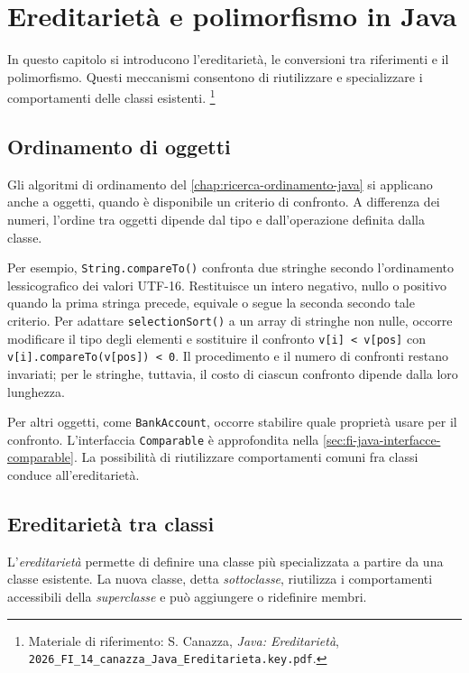 \chapter{Ereditarietà e polimorfismo in Java}
\label{chap:ereditarieta-polimorfismo-java}

In questo capitolo si
introducono l'ereditarietà, le conversioni tra riferimenti e il
polimorfismo. Questi meccanismi consentono di riutilizzare e
specializzare i comportamenti delle classi esistenti.%
\footnote{Materiale di riferimento: S. Canazza,
\emph{Java: Ereditarietà},
\nolinkurl{2026_FI_14_canazza_Java_Ereditarieta.key.pdf}.}

\section{Ordinamento di oggetti}
\label{sec:fi-java-ereditarieta-ordinamento-oggetti}

Gli algoritmi di ordinamento del
\cref{chap:ricerca-ordinamento-java} si applicano anche a oggetti,
quando è disponibile un criterio di confronto. A differenza dei
numeri, l'ordine tra oggetti dipende dal tipo e dall'operazione
definita dalla classe.

Per esempio, \texttt{String.compareTo()} confronta due stringhe
secondo l'ordinamento lessicografico dei valori UTF-16. Restituisce
un intero negativo, nullo o positivo quando la prima stringa
precede, equivale o segue la seconda secondo tale criterio.
Per adattare \texttt{selectionSort()} a un array di stringhe
non nulle, occorre modificare il tipo degli elementi e sostituire
il confronto \lstinline|v[i] < v[pos]| con
\lstinline|v[i].compareTo(v[pos]) < 0|. Il procedimento e il numero
di confronti restano invariati; per le stringhe, tuttavia, il
costo di ciascun confronto dipende dalla loro lunghezza.

Per altri oggetti, come \texttt{BankAccount}, occorre stabilire
quale proprietà usare per il confronto. L'interfaccia
\texttt{Comparable} è approfondita nella
\cref{sec:fi-java-interfacce-comparable}. La possibilità di
riutilizzare comportamenti comuni fra classi conduce
all'ereditarietà.

\section{Ereditarietà tra classi}
\label{sec:fi-java-ereditarieta}

\begin{definition}[Ereditarietà]
\label{def:fi-java-ereditarieta}
L'\emph{ereditarietà} permette di definire una classe più
specializzata a partire da una classe esistente. La nuova classe,
detta \emph{sottoclasse}, riutilizza i comportamenti accessibili della
\emph{superclasse} e può aggiungere o ridefinire membri.
\end{definition}

